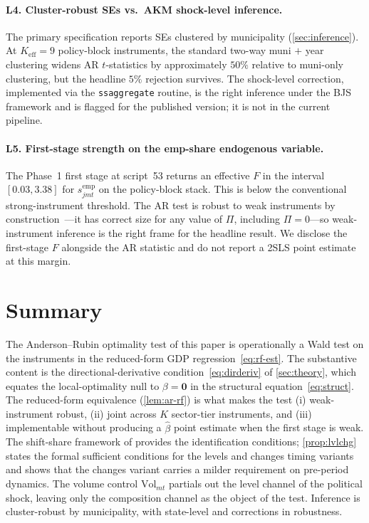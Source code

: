 \documentclass{article}
\newcommand{\Vol}{\mathrm{Vol}}
\newcommand{\bzero}{\mathbf{0}}
\theoremstyle{plain}
\theoremstyle{definition}
\theoremstyle{remark}
\begin{document}
\paragraph{L4. Cluster-robust SEs vs.\ AKM shock-level inference.}
The primary specification reports SEs clustered by municipality
(\autoref{sec:inference}). At $K_{\mathrm{eff}}=9$ policy-block instruments,
the standard two-way muni $+$ year clustering widens AR $t$-statistics by
approximately $50\%$ relative to muni-only clustering, but the headline
$5\%$ rejection survives. The \citet{adao2019shift} shock-level correction,
implemented via the \texttt{ssaggregate} routine, is the right inference
under the BJS framework and is flagged for the published version; it is
not in the current pipeline.

\paragraph{L5. First-stage strength on the emp-share endogenous variable.}
The Phase~1 first stage at script~53 returns an effective $F$ in the
interval $[0.03,3.38]$ for $s^{\mathrm{emp}}_{jmt}$ on the
policy-block stack. This is below the conventional strong-instrument
threshold. The AR test is robust to weak instruments by
construction~\citep{andrews2019weak}---it has correct size for any value
of $\Pi$, including $\Pi=0$---so weak-instrument inference is the right
frame for the headline result. We disclose the first-stage $F$ alongside
the AR statistic and do not report a 2SLS point estimate at this margin.

\section{Summary}\label{sec:summary}

The Anderson--Rubin optimality test of this paper is operationally a Wald test
on the instruments in the reduced-form GDP regression~\eqref{eq:rf-est}. The
substantive content is the directional-derivative condition~\eqref{eq:dirderiv}
of \autoref{sec:theory}, which equates the local-optimality null to
$\beta=\bzero$ in the structural equation~\eqref{eq:struct}. The reduced-form
equivalence (\autoref{lem:ar-rf}) is what makes the test (i) weak-instrument
robust, (ii) joint across $K$ sector-tier instruments, and (iii) implementable
without producing a $\hat\beta$ point estimate when the first stage is weak.
The shift-share framework of \citet{borusyak2022quasi} provides the
identification conditions; \autoref{prop:lvlchg} states the formal sufficient
conditions for the levels and changes timing variants and shows that the
changes variant carries a milder requirement on pre-period dynamics. The
volume control $\Vol_{mt}$ partials out the level channel of the political
shock, leaving only the composition channel as the object of the test.
Inference is cluster-robust by municipality, with state-level and
\citet{adao2019shift} corrections in robustness.
\end{document}
